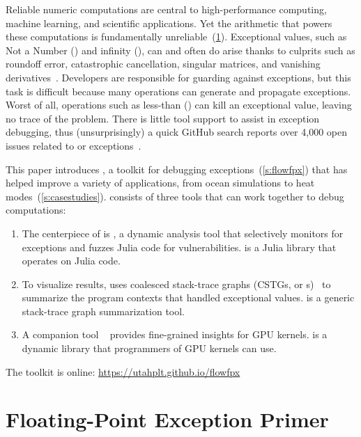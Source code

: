 \documentclass{juliacon}
\begin{document}
Reliable numeric computations are central to high-performance computing,
machine learning, and scientific applications.
Yet the \fp{} arithmetic that powers these computations is fundamentally
unreliable~(\cref{s:background}).
Exceptional values, such as Not a Number (\Nan{}) and infinity (\Inf{}),
can and often do arise thanks to culprits such as roundoff error,
catastrophic cancellation, singular matrices, and vanishing
derivatives~\cite{sdjmrstp-pc-2022,ddghlllprr-correctness-2022,gllprt-correctness-2021,fpchecker-reports,llg-soap-2022,bllmg-xloop-2022}.
Developers are responsible for guarding against exceptions, but this task
is difficult because many operations can generate and propagate exceptions.
Worst of all, operations such as less-than (\code{<}) can kill an exceptional value,
leaving no trace of the problem.
There is little tool support to assist in exception debugging,
thus (unsurprisingly) a quick GitHub search reports over 4,000 open issues
related to \NaN{} or \Inf{} exceptions~\cite{github-issues}.

This paper introduces \FlowFPX{}, a toolkit for debugging
\fp{} exceptions~(\cref{s:flowfpx})
that has helped improve a variety of applications,
from ocean simulations to heat modes~(\cref{s:casestudies}).
\FlowFPX{} consists of three tools that can work together to debug \fp{} computations:
\begin{enumerate}
  \item
    The centerpiece of \FlowFPX{} is \FT{}, a dynamic analysis tool that
    selectively monitors for exceptions and fuzzes Julia code for vulnerabilities.
    \FT{} is a Julia library that operates on Julia code.
  \item
    To visualize results, \FlowFPX{} uses coalesced stack-trace graphs (CSTGs, or
    \CSTG{}s)~\cite{humphreySystematicDebuggingMethods2014}
    to summarize the program contexts that handled exceptional values.
    \CSTG{} is a generic stack-trace graph summarization tool.
  \item
    A companion tool \GPUFPX{}~\cite{llsflg-hpdc-2023} provides fine-grained insights for GPU kernels.
    \GPUFPX{} is a dynamic library that programmers of GPU kernels can use.
\end{enumerate}

\noindent%
The toolkit is online: \url{https://utahplt.github.io/flowfpx}


\section{Floating-Point Exception Primer}
\label{s:background}
\end{document}
